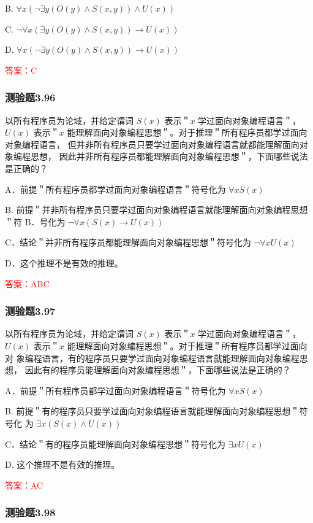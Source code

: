 \documentclass[UTF8, heading=true]{ctexart}
\begin{document}
B. $
\forall x(\neg \exists y(O(y) \wedge S(x, y)) \wedge U(x))
$


C. $
\neg \forall x(\exists y(O(y) \wedge S(x, y)) \rightarrow U(x))
$


D. $
\forall x(\neg \exists y(O(y) \wedge S(x, y)) \rightarrow U(x))
$

\textcolor{red}{答案：C}

\subsubsection{测验题3.96}

以所有程序员为论域，并给定谓词 $S(x)$ 表示＂$x$ 学过面向对象编程语言＂，$U(x)$ 表示＂$x$ 
能理解面向对象编程思想＂。对于推理＂所有程序员都学过面向对象编程语言，
但并非所有程序员只要学过面向对象编程语言就都能理解面向对象编程思想，
因此并非所有程序员都能理解面向对象编程思想＂，下面哪些说法是正确的？

A．前提＂所有程序员都学过面向对象编程语言＂符号化为 $\forall x S(x)$

B. 前提＂并非所有程序员只要学过面向对象编程语言就能理解面向对象编程思想＂符 B．号化为 $\neg \forall x(S(x) \rightarrow U(x))$

C．结论＂并非所有程序员都能理解面向对象编程思想＂符号化为 $\neg \forall x U(x)$

D．这个推理不是有效的推理。

\textcolor{red}{答案：ABC}

\subsubsection{测验题3.97}

以所有程序员为论域，并给定谓词 $S(x)$ 表示＂$x$ 学过面向对象编程语言＂，$U(x)$ 
表示＂$x$ 能理解面向对象编程思想＂。对于推理＂所有程序员都学过面向对
象编程语言，有的程序员只要学过面向对象编程语言就能理解面向对象编程思想，
因此有的程序员能理解面向对象编程思想＂，下面哪些说法是正确的？

A．前提＂所有程序员都学过面向对象编程语言＂符号化为 $\forall x S(x)$

B. 前提＂有的程序员只要学过面向对象编程语言就能理解面向对象编程思想＂符号化
为 $\exists x(S(x) \wedge U(x))$

C．结论＂有的程序员能理解面向对象编程思想＂符号化为 $\exists x U(x)$

D. 这个推理不是有效的推理。

\textcolor{red}{答案：AC}

\subsubsection{测验题3.98}
\end{document}
